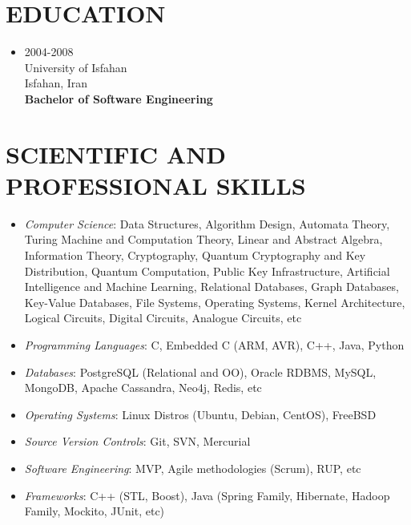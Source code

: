\documentclass[10pt,a4paper]{article}
\begin{document}

\section{EDUCATION}

  \begin{itemize}
    \item \small {2004-2008 \\
                  University of Isfahan \\
                  Isfahan, Iran \\
                  \textbf{Bachelor of Software Engineering}}
  \end{itemize}



\section{SCIENTIFIC AND PROFESSIONAL SKILLS}
\begin{itemize}
  \setlength{\rightskip}{2cm}
  \setlength\itemsep{0em}
  \item \small \textit {Computer Science}:
  Data Structures, Algorithm Design, Automata Theory, Turing Machine and Computation Theory, Linear and Abstract Algebra, Information Theory, Cryptography, Quantum Cryptography and Key Distribution, Quantum Computation, Public Key Infrastructure, Artificial Intelligence and Machine Learning,  Relational Databases, Graph Databases, Key-Value Databases, File Systems, Operating Systems, Kernel Architecture, Logical Circuits, Digital Circuits, Analogue Circuits, etc
  \item \small \textit {Programming Languages}:
  C, Embedded C (ARM, AVR), C++, Java, Python
  \item \small \textit {Databases}:
  PostgreSQL (Relational and OO), Oracle RDBMS, MySQL, MongoDB, Apache Cassandra, Neo4j, Redis, etc
  \item \small \textit {Operating Systems}:
  Linux Distros (Ubuntu, Debian, CentOS), FreeBSD
  \item \small \textit {Source Version Controls}:
  Git, SVN, Mercurial
  \item \small \textit {Software Engineering}:
  MVP, Agile methodologies (Scrum), RUP, etc
  \item \small \textit {Frameworks}: C++ (STL, Boost), Java (Spring Family, Hibernate, Hadoop Family, Mockito, JUnit, etc)
\end{itemize}
\end{document}
